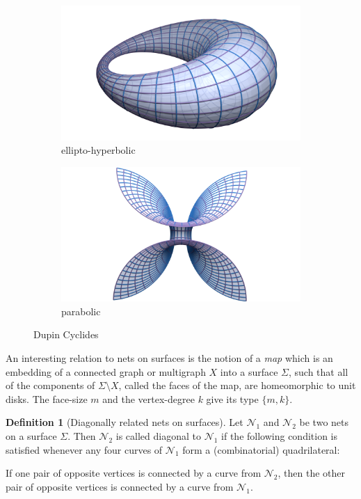 \documentclass[12pt,a4paper]{article}
\theoremstyle{definition}
\newtheorem{definition}{Definition}[section]
\theoremstyle{remark}
\theoremstyle{definition}
\begin{document}
\begin{figure}[!tbp]
  \begin{subfigure}[b]{0.5\textwidth}
    \includegraphics[width=\textwidth]{Dupin-net.png}
    \caption{ellipto-hyperbolic}
    \label{fig:ellipto-hyperbolic-cyclides}
  \end{subfigure}
  \hfill
  \begin{subfigure}[b]{0.5\textwidth}
    \includegraphics[width=\textwidth]{Dupin-net-2.png}
    \caption{parabolic}
    \label{fig:parabolic-cyclides}
  \end{subfigure}
  \caption{Dupin Cyclides}
\end{figure}

An interesting relation to nets on surfaces is the notion of a \textit{map} \cite{} which is an embedding of a connected
graph or multigraph $X$ into a surface $\Sigma$, such that all of the components of $\Sigma \setminus X$, called
the faces of the map, are homeomorphic to unit disks. The face-size $m$ and the vertex-degree $k$ give its type $\{m, k\}$.

\begin{definition}[Diagonally related nets on surfaces]
\label{def:diag-nets-on-surfaces}
Let $\mathcal{N}_{1}$ and $\mathcal{N}_{2}$ be two nets on a surface $\Sigma$. Then $\mathcal{N}_{2}$ is called diagonal
to $\mathcal{N}_{1}$ if the following condition is satisfied whenever any four curves of $\mathcal{N}_{1}$ form a
(combinatorial) quadrilateral:\\
\begin{mybox}{}
If one pair of opposite vertices is connected by a curve from $\mathcal{N}_{2}$, then the other pair of opposite vertices is connected by a curve from $\mathcal{N}_{1}$.
\end{mybox}
\end{definition}
\end{document}
